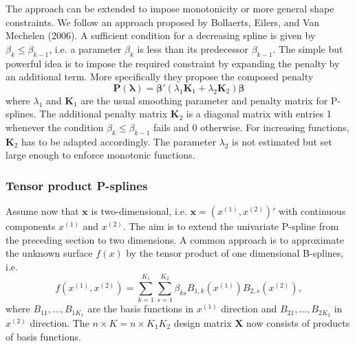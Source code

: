 \documentclass[11pt,a4paper,twoside]{bayesxarticle}
\def \Kvec {\vec{K}}
\def \Pvec {\vec{P}}
\def \lambdavec {\boldsymbol{\lambda}}
\def \betavec {\boldsymbol{\beta}}
\def \xvec {\mathbf{x}}
\def \Kvec {\mathbf{K}}
\def \Pvec {\mathbf{P}}
\def \Xvec {\mathbf{X}}
\begin{document}
The approach can be extended to impose monotonicity or more general shape constraints.
We follow an approach proposed by Bollaerts, Eilers, and Van Mechelen (2006).
A sufficient condition for a decreasing
spline is given by $\beta_{k} \leq \beta_{k-1}$, i.e.  a parameter $\beta_{k}$ is less than its predecessor $\beta_{k-1}$.
The simple but powerful idea  is to impose the
required constraint by expanding the penalty by an additional  term. More specifically they propose
the composed penalty
$$
\Pvec(\lambdavec) =  \betavec' \left( \lambda_1 \Kvec_1 + \lambda_2 \Kvec_2 \right) \betavec
$$
where $\lambda_1$ and $\Kvec_1$ are the usual smoothing parameter
and penalty matrix for P-splines. The additional penalty matrix
$\Kvec_2$ is a diagonal matrix with entries 1 whenever the condition
$\beta_{k} \leq \beta_{k-1}$ fails and 0 otherwise. For increasing
functions, $\Kvec_2$ has to be adapted accordingly. The parameter
$\lambda_2$ is not estimated but set large enough to enforce
monotonic functions.





\subsubsection{Tensor product P-splines}
\label{tensorproductpsplines} Assume now that $\xvec$ is
two-dimensional, i.e. $\xvec = \left(x^{(1)},x^{(2)}\right)'$ with
continuous components $x^{(1)}$ and $x^{(2)}$. The aim is to extend
the univariate P-spline from the preceding section to two
dimensions. A common approach is to approximate the unknown surface
$f(x)$ by the tensor product of one dimensional B-splines, i.e.
\begin{equation}
\label{gampspline_2dimterm} f\left(x^{(1)},x^{(2)}\right) = \sum_{k=1}^{K_1}
\sum_{s=1}^{K_2} \beta_{ks} B_{1,k}(x^{(1)})
B_{2,s} (x^{(2)}),
\end{equation}
where $B_{11},\dots,B_{1K_1}$ are the basis functions in $x^{(1)}$ direction and
$B_{21},\dots,B_{2K_2}$ in $x^{(2)}$ direction.
The $n \times K = n \times K_1 K_2$ design matrix $\Xvec$ now consists of
products of basis functions.
\end{document}
